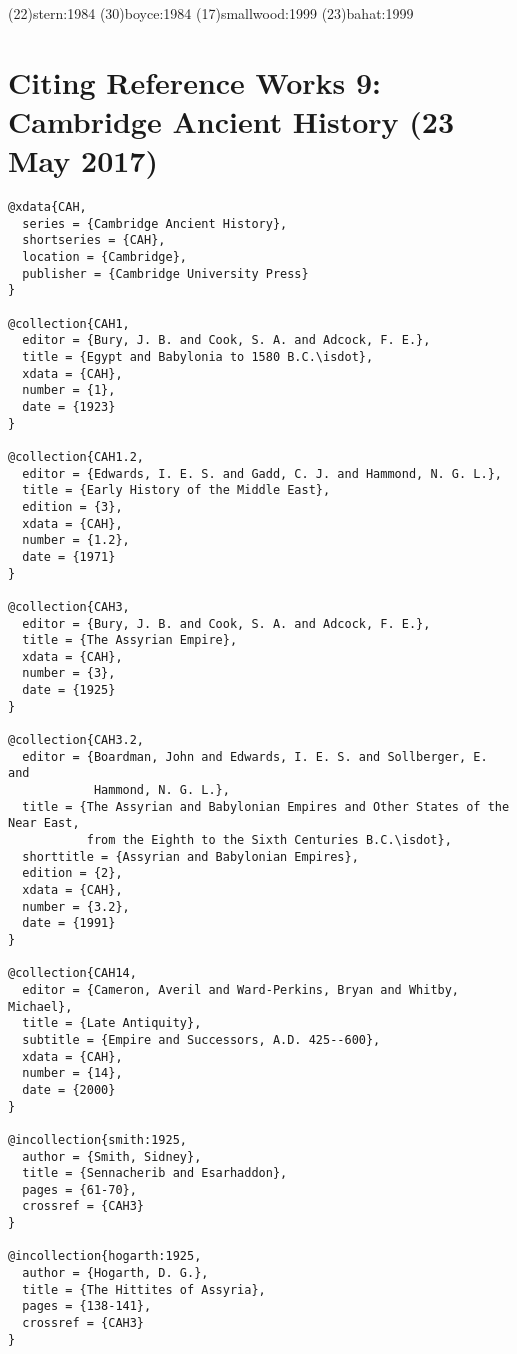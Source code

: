 \documentclass[a4paper]{article}
\begin{document}
\examplecite(22){stern:1984}
\examplecite(30){boyce:1984}
\examplecite(17){smallwood:1999}
\examplecite(23){bahat:1999}
\begin{verbcite}
  \nocite{CHJ2, CHJ4, CHJ5, CHJ6, CHJ7, CHJ8}
\end{verbcite}
\exampleabbreviations
\examplebibliography
{}

\section{Citing Reference Works 9: Cambridge Ancient History (23 May 2017)}

\begin{verbatim}
@xdata{CAH,
  series = {Cambridge Ancient History},
  shortseries = {CAH},
  location = {Cambridge},
  publisher = {Cambridge University Press}
}

@collection{CAH1,
  editor = {Bury, J. B. and Cook, S. A. and Adcock, F. E.},
  title = {Egypt and Babylonia to 1580 B.C.\isdot},
  xdata = {CAH},
  number = {1},
  date = {1923}
}

@collection{CAH1.2,
  editor = {Edwards, I. E. S. and Gadd, C. J. and Hammond, N. G. L.},
  title = {Early History of the Middle East},
  edition = {3},
  xdata = {CAH},
  number = {1.2},
  date = {1971}
}

@collection{CAH3,
  editor = {Bury, J. B. and Cook, S. A. and Adcock, F. E.},
  title = {The Assyrian Empire},
  xdata = {CAH},
  number = {3},
  date = {1925}
}

@collection{CAH3.2,
  editor = {Boardman, John and Edwards, I. E. S. and Sollberger, E. and
            Hammond, N. G. L.},
  title = {The Assyrian and Babylonian Empires and Other States of the Near East,
           from the Eighth to the Sixth Centuries B.C.\isdot},
  shorttitle = {Assyrian and Babylonian Empires},
  edition = {2},
  xdata = {CAH},
  number = {3.2},
  date = {1991}
}

@collection{CAH14,
  editor = {Cameron, Averil and Ward-Perkins, Bryan and Whitby, Michael},
  title = {Late Antiquity},
  subtitle = {Empire and Successors, A.D. 425--600},
  xdata = {CAH},
  number = {14},
  date = {2000}
}

@incollection{smith:1925,
  author = {Smith, Sidney},
  title = {Sennacherib and Esarhaddon},
  pages = {61-70},
  crossref = {CAH3}
}

@incollection{hogarth:1925,
  author = {Hogarth, D. G.},
  title = {The Hittites of Assyria},
  pages = {138-141},
  crossref = {CAH3}
}


\end{verbatim}
\end{document}
